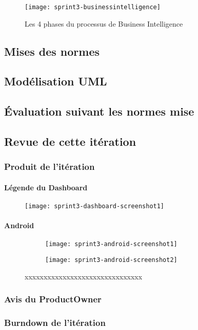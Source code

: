 \begin{figure}[htbp]
  \centering
  \texttt{[image: sprint3-businessintelligence]}
  \caption{Les 4 phases du processus de Business Intelligence}
  \label{fig:sprint3-businessintelligence}
\end{figure}
\clearpage

\subsection{Mises des normes}

\subsection{Modélisation UML}

\subsection{Évaluation suivant les normes mise}
\subsection{Revue de cette itération}
\subsubsection{Produit de l'itération}
\paragraph{Légende du Dashboard}

\begin{figure}[htbp]
  \centering
  \texttt{[image: sprint3-dashboard-screenshot1]}
  \caption{}
  \label{fig:sprint3-dashboard-screenshot1}
\end{figure}
\paragraph{Android}
\begin{figure}[htbp]
    \begin{subfigure}{.5\textwidth}
    \centering
  \centering
  \texttt{[image: sprint3-android-screenshot1]}
  \caption{}
  \label{fig:sprint3-android-screenshot1}
\end{subfigure}
\begin{subfigure}{.5\textwidth}
    \centering
  \centering
  \texttt{[image: sprint3-android-screenshot2]}
  \caption{}
  \label{fig:sprint3-android-screenshot2}
\end{subfigure}
\caption{xxxxxxxxxxxxxxxxxxxxxxxxxxxxxxx}
\end{figure}

\subsubsection{Avis du ProductOwner}

\subsubsection{Burndown de l’itération}

